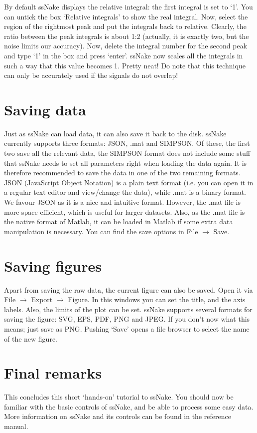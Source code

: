\documentclass[11pt,a4paper]{article}
\begin{document}
 By default ssNake displays the relative integral: the first integral is set to `1'. You can untick the box `Relative integrals' to show the real integral. Now, select the region of the rightmost peak and put the integrals back to relative. Clearly, the ratio between the peak integrals is about 1:2 (actually, it is exactly two, but the noise limits our accuracy). Now, delete the integral number for the second peak and type `1' in the box and press `enter'. ssNake now scales all the integrals in such a way that this value becomes 1. Pretty neat! Do note that this technique can only be accurately used if the signals do not overlap!



\section{Saving data}
Just as ssNake can load data, it can also save it back to the disk. ssNake currently supports three formats: JSON, .mat and SIMPSON. Of these, the first two save all the relevant data, the SIMPSON format does not include some stuff that ssNake needs to set all parameters right when loading the data again. It is therefore recommended to save the data in one of the two remaining formats. JSON (JavaScript Object Notation) is a plain text format (i.e. you can open it in a regular text editor and view/change the data), while .mat is a binary format. We favour JSON as it is a nice and intuitive format. However, the .mat file is more space efficient, which is useful for larger datasets. Also, as the .mat file is the native format of {\sc Matlab}, it can be loaded in {\sc Matlab} if some extra data manipulation is necessary. You can find the save options in File $\rightarrow$ Save. 

\section{Saving figures}
Apart from saving the raw data, the current figure can also be saved. Open it via File $\rightarrow$ Export $\rightarrow$ Figure. In this windows you can set the title, and the axis labels. Also, the limits of the plot can be set. ssNake supports several formats for saving the figure: SVG, EPS, PDF, PNG and JPEG. If you don't now what this means; just save as PNG. Pushing `Save' opens a file browser to select the name of the new figure.



\section{Final remarks}
This concludes this short `hands-on' tutorial to ssNake. You should now be familiar with the basic controls of ssNake, and be able to process some easy data. More information on ssNake and its controls can be found in the reference manual.







%
%
\end{document}
